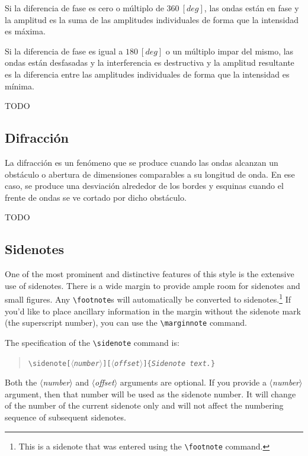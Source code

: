 \documentclass{tufte-handout}
\newcommand{\doccmd}[1]{\texttt{\textbackslash#1}}%
\newcommand{\docopt}[1]{\ensuremath{\langle}\textrm{\textit{#1}}\ensuremath{\rangle}}%
\newcommand{\docarg}[1]{\textrm{\textit{#1}}}%
\newenvironment{docspec}{\begin{quote}\noindent}{\end{quote}}%
\begin{document}
Si la diferencia de fase es cero o múltiplo de $360~[deg]$, las ondas están en fase y la amplitud es la suma de las amplitudes individuales de forma que la intensidad es máxima.

Si la diferencia de fase es igual a $180~[deg]$ o un múltiplo impar del mismo, las ondas están desfasadas y la interferencia es destructiva y la amplitud resultante es la diferencia entre las amplitudes individuales de forma que la intensidad es mínima.

TODO

\subsection{Difracción}

La difracción es un fenómeno que se produce cuando las ondas alcanzan un obstáculo o abertura de dimensiones comparables a su longitud de onda. En ese caso, se produce una desviación alrededor de los bordes y esquinas cuando el frente de ondas se ve cortado por dicho obstáculo.

TODO

\clearpage

\subsection{Sidenotes}\label{sec:sidenotes}
One of the most prominent and distinctive features of this style is the
extensive use of sidenotes.  There is a wide margin to provide ample room
for sidenotes and small figures.  Any \Verb|\footnote|s will automatically
be converted to sidenotes.\footnote{This is a sidenote that was entered
using the \texttt{\textbackslash footnote} command.}  If you'd like to place ancillary
information in the margin without the sidenote mark (the superscript
number), you can use the \Verb|\marginnote| command.

The specification of the \Verb|\sidenote| command is:
\begin{docspec}
  \doccmd{sidenote[\docopt{number}][\docopt{offset}]\{\docarg{Sidenote text.}\}}
\end{docspec}

Both the \docopt{number} and \docopt{offset} arguments are optional.  If you
provide a \docopt{number} argument, then that number will be used as the
sidenote number.  It will change of the number of the current sidenote only and
will not affect the numbering sequence of subsequent sidenotes.
\end{document}
